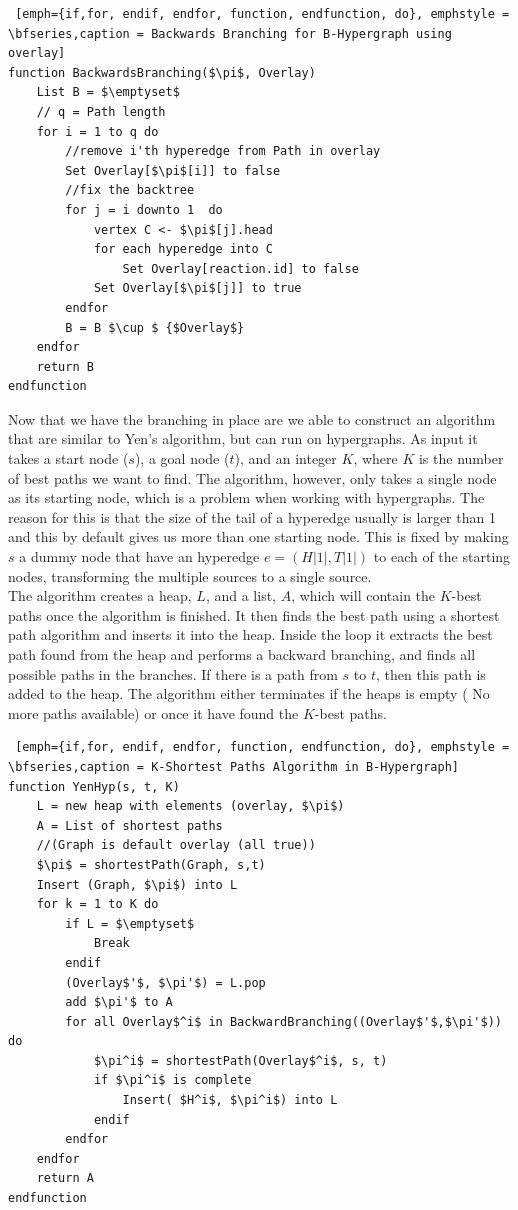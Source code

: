 \documentclass[a4paper,10pt,titlepage]{paper}
\begin{document}
\begin{lstlisting} [emph={if,for, endif, endfor, function, endfunction, do}, emphstyle = \bfseries,caption = Backwards Branching for B-Hypergraph using overlay]
function BackwardsBranching($\pi$, Overlay) 						
	List B = $\emptyset$
	// q = Path length
	for i = 1 to q do			
		//remove i'th hyperedge from Path in overlay					
		Set Overlay[$\pi$[i]] to false		
		//fix the backtree				
		for j = i downto 1	do							
			vertex C <- $\pi$[j].head
			for each hyperedge into C
				Set Overlay[reaction.id] to false
			Set Overlay[$\pi$[j]] to true
		endfor
		B = B $\cup $ {$Overlay$}
	endfor
	return B
endfunction
\end{lstlisting}
Now that we have the branching in place are we able to construct an algorithm that are similar to Yen's algorithm, but can run on hypergraphs. As input it takes a start node ($s$), a goal node ($t$), and an integer $K$, where $K$ is the number of best paths we want to find. The algorithm, however, only takes a single node as its starting node, which is a problem when working with hypergraphs. The reason for this is that the size of the tail of a hyperedge usually is larger than 1 and this by default gives us more than one starting node. This is fixed by making $s$ a dummy node that have an hyperedge $e = (H|1|, T|1|)$ to each of the starting nodes, transforming the multiple sources to a single source.\\
The algorithm creates a heap, $L$, and a list, $A$, which will contain the $K$-best paths once the algorithm is finished. It then finds the best path using a shortest path algorithm and inserts it into the heap. Inside the loop it extracts the best path found from the heap and performs a backward branching, and finds all possible paths in the branches. If there is a path from $s$ to $t$, then this path is added to the heap. The algorithm either terminates if the heaps is empty ( No more paths available) or once it have found the $K$-best paths.
\begin{lstlisting} [emph={if,for, endif, endfor, function, endfunction, do}, emphstyle = \bfseries,caption = K-Shortest Paths Algorithm in B-Hypergraph]
function YenHyp(s, t, K) 
	L = new heap with elements (overlay, $\pi$)
	A = List of shortest paths
	//(Graph is default overlay (all true))
	$\pi$ = shortestPath(Graph, s,t) 				
	Insert (Graph, $\pi$) into L
	for k = 1 to K do
		if L = $\emptyset$
			Break
		endif
		(Overlay$'$, $\pi'$) = L.pop
		add $\pi'$ to A
		for all Overlay$^i$ in BackwardBranching((Overlay$'$,$\pi'$)) do
			$\pi^i$ = shortestPath(Overlay$^i$, s, t)
			if $\pi^i$ is complete
				Insert( $H^i$, $\pi^i$) into L
			endif
		endfor
	endfor
	return A
endfunction
\end{lstlisting}
\end{document}
